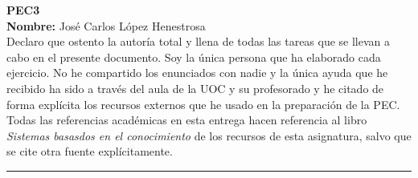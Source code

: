 \documentclass[11pt, a4paper]{article}
\begin{document}
	\begin{center}
		\Large{ \textbf{PEC3} } \\
		\vspace{0.5cm}
		\normalsize{\textbf{Nombre:} José Carlos López Henestrosa} \\
		\vspace{0.5cm}
		\normalsize{Declaro que ostento la autoría total y llena de todas las tareas que se llevan a cabo en el presente documento. Soy la única persona que ha elaborado cada ejercicio. No he compartido los enunciados con nadie y la única ayuda que he recibido ha sido a través del aula de la UOC y su profesorado y he citado de forma explícita los recursos externos que he usado en la preparación de la PEC.} \\
		\vspace{0.5cm}
		\normalsize{Todas las referencias académicas en esta entrega hacen referencia al libro \textit{Sistemas basasdos en el conocimiento} de los recursos de esta asignatura, salvo que se cite otra fuente explícitamente.}
	\end{center}

	\vspace{1cm}
	\hrule
	\vspace{1cm}
\end{document}
